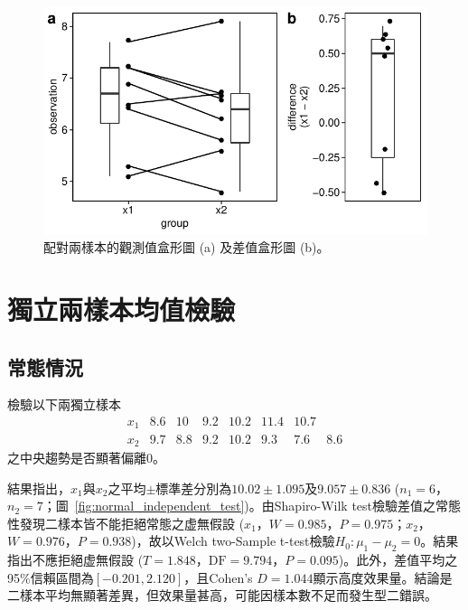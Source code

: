 \documentclass[12pt]{article}
\renewcommand{\figurename}{圖}
\newcommand*{\figref}[1]{\figurename~\ref{#1}}
\begin{document}
\begin{figure}[htbp]
	\centering
	\includegraphics[]{non-normal_paired_test.pdf}
	\caption{配對兩樣本的觀測值盒形圖 (a) 及差值盒形圖 (b)。}
	\label{fig:non-normal_paired_test}
\end{figure}

\section{獨立兩樣本均值檢驗}
\subsection{常態情況}
檢驗以下兩獨立樣本
\[
\begin{matrix}
x_1 & 8.6 & 10 & 9.2 & 10.2 & 11.4 & 10.7 & \\
x_2 & 9.7 & 8.8 & 9.2 & 10.2 & 9.3 & 7.6 & 8.6
\end{matrix}
\]
之中央趨勢是否顯著偏離0。

結果指出，$x_1$與$x_2$之平均$\pm$標準差分別為$10.02 \pm 1.095$及$9.057 \pm 0.836$ ($n_1 = 6$，$n_2 = 7$；\figref{fig:normal_independent_test})。由Shapiro-Wilk test檢驗差值之常態性發現二樣本皆不能拒絕常態之虚無假設 ($x_1$，$W = 0.985$，$P = 0.975$；$x_2$，$W = 0.976$，$P = 0.938$)，故以Welch two-Sample t-test檢驗$H_0: \mu_1 - \mu_2 = 0$。結果指出不應拒絕虚無假設 ($T = 1.848$，$\text{DF} = 9.794$，$P = 0.095$)。此外，差值平均之95\%信賴區間為$\left[-0.201, 2.120\right]$，且Cohen's $D = 1.044$顯示高度效果量。結論是二樣本平均無顯著差異，但效果量甚高，可能因樣本數不足而發生型二錯誤。
\end{document}
